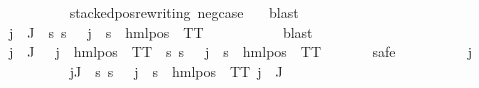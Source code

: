 \begin{isabellebody}
\ \ \ \ \ \ \ \ \isamarkupfalse%
\ stacked{\isacharunderscore}{\kern0pt}pos{\isacharunderscore}{\kern0pt}rewriting\ neg{\isacharunderscore}{\kern0pt}case\ {}\ \isamarkupfalse%
\ blast\isanewline
\ \ \ \ \ \ \isamarkupfalse%
\ {\isachardoublequoteopen}{\isasymforall}j\ {\isasymin}\ J{\isachardot}{\kern0pt}\ {\isacharparenleft}{\kern0pt}{\isasymexists}{\isasymalpha}{\isachardot}{\kern0pt}\ {\isacharparenleft}{\kern0pt}{\isasymforall}s{\isachardot}{\kern0pt}\ {\isacharparenleft}{\kern0pt}s\ {\isasymTurnstile}\ {\isasymPhi}\ j{\isacharparenright}{\kern0pt}\ {\isasymlongleftrightarrow}\ {\isacharparenleft}{\kern0pt}s\ {\isasymTurnstile}\ {\isacharparenleft}{\kern0pt}hml{\isacharunderscore}{\kern0pt}pos\ {\isasymalpha}\ TT{\isacharparenright}{\kern0pt}{\isacharparenright}{\kern0pt}{\isacharparenright}{\kern0pt}{\isacharparenright}{\kern0pt}{\isachardoublequoteclose}\ \isanewline
\ \ \ \ \ \ \ \ \isamarkupfalse%
\ blast\isanewline
\ \ \ \ \ \ \isamarkupfalse%
\ {\isachardoublequoteopen}{\isasymforall}j\ {\isasymin}\ J{\isachardot}{\kern0pt}\ {\isasymexists}{\isasymalpha}\ {\isachardot}{\kern0pt}{\isasymPsi}\ j\ {\isacharequal}{\kern0pt}\ {\isacharparenleft}{\kern0pt}hml{\isacharunderscore}{\kern0pt}pos\ {\isasymalpha}\ TT{\isacharparenright}{\kern0pt}\ {\isasymand}\ {\isacharparenleft}{\kern0pt}{\isasymforall}s{\isachardot}{\kern0pt}\ {\isacharparenleft}{\kern0pt}s\ {\isasymTurnstile}\ {\isacharparenleft}{\kern0pt}{\isasymPhi}\ j{\isacharparenright}{\kern0pt}{\isacharparenright}{\kern0pt}\ {\isasymlongleftrightarrow}\ {\isacharparenleft}{\kern0pt}s\ {\isasymTurnstile}\ {\isacharparenleft}{\kern0pt}hml{\isacharunderscore}{\kern0pt}pos\ {\isasymalpha}\ TT{\isacharparenright}{\kern0pt}{\isacharparenright}{\kern0pt}{\isacharparenright}{\kern0pt}{\isachardoublequoteclose}\isanewline
\ \ \ \ \ \ \isamarkupfalse%
{\isacharparenleft}{\kern0pt}safe{\isacharparenright}{\kern0pt}\isanewline
\ \ \ \ \ \ \ \ \isamarkupfalse%
\ j\isanewline
\ \ \ \ \ \ \ \ \isamarkupfalse%
\ {\isachardoublequoteopen}{\isasymforall}j{\isasymin}J{\isachardot}{\kern0pt}\ {\isasymexists}{\isasymalpha}{\isachardot}{\kern0pt}\ {\isasymforall}s{\isachardot}{\kern0pt}\ {\isacharparenleft}{\kern0pt}s\ {\isasymTurnstile}\ {\isasymPhi}\ j{\isacharparenright}{\kern0pt}\ {\isacharequal}{\kern0pt}\ {\isacharparenleft}{\kern0pt}s\ {\isasymTurnstile}\ hml{\isacharunderscore}{\kern0pt}pos\ {\isasymalpha}\ TT{\isacharparenright}{\kern0pt}{\isachardoublequoteclose}\ {\isachardoublequoteopen}j\ {\isasymin}\ J{\isachardoublequoteclose}\isanewline

\end{isabellebody}
